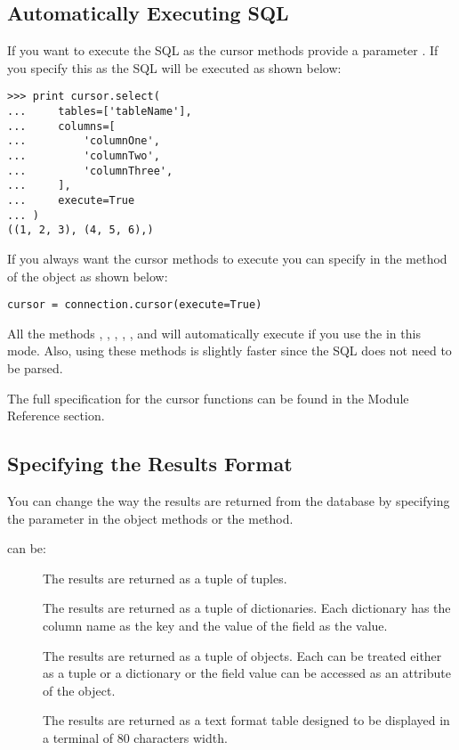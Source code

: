 \documentclass{howto}
\begin{document}
\subsection{Automatically Executing SQL}

If you want to execute the SQL as the cursor methods provide a parameter . If you specify this as  the SQL will be executed as shown below:

\begin{verbatim}
>>> print cursor.select(
...     tables=['tableName'],
...     columns=[
...         'columnOne',
...         'columnTwo',
...         'columnThree',
...     ],
...     execute=True
... )
((1, 2, 3), (4, 5, 6),)
\end{verbatim}

If you always want the cursor methods to execute you can specify  in the  method of the  object as shown below:

\begin{verbatim}
cursor = connection.cursor(execute=True)
\end{verbatim}

All the methods , , , , ,  and  will automatically execute if you use the  in this mode. Also, using these methods is slightly faster since the SQL does not need to be parsed.

The full specification for the cursor functions can be found in the Module Reference section.

\subsection{Specifying the Results Format}

You can change the way the results are returned from the database by specifying the  parameter in the  object  methods or the  method. 

 can be:

\begin{description}
\item[]
The results are returned as a tuple of tuples.
\item[]
The results are returned as a tuple of dictionaries. Each dictionary has the column name as the key and the value of the field as the value.
\item[]
The results are returned as a tuple of  objects. Each  can be treated either as a tuple or a dictionary or the field value can be accessed as an attribute of the object. 
\item[]
The results are returned as a text format table designed to be displayed in a terminal of 80 characters width.
\end{description}
\end{document}
